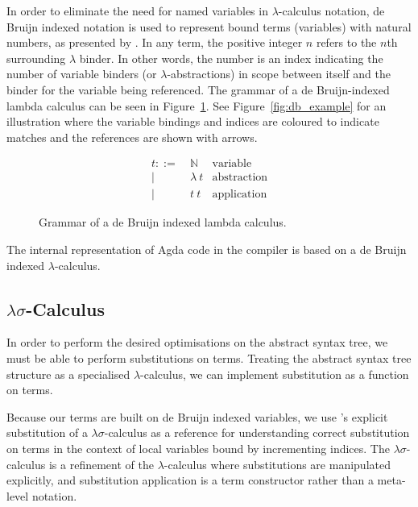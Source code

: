In order to eliminate the need for named variables in $\lambda$-calculus notation, de Bruijn indexed notation is used to represent bound terms (variables) with natural numbers, as presented by \citet{deBruijn-1972}. In any term, the positive integer $n$ refers to the $n$th surrounding $\lambda$ binder. In other words, the number is an index indicating the number of variable binders (or $\lambda$-abstractions) in scope between itself and the binder for the variable being referenced. The grammar of a de Bruijn-indexed lambda calculus can be seen in Figure~\ref{fig:db_lambda_calc}. See Figure~\ref{fig:db_example} for an illustration where the variable bindings and indices are coloured to indicate matches and the references are shown with arrows.



\begin{figure}[h]
\begin{align*}
t ::=~& \mathbb{N}      & \text{variable}\\
    |~& \lambda~t       & \text{abstraction}\\
    |~& t~t             & \text{application}
\end{align*}
\caption{Grammar of a de Bruijn indexed lambda calculus.}
\label{fig:db_lambda_calc}
\end{figure}

The internal representation of Agda code in the compiler is based on a de Bruijn indexed $\lambda$-calculus.

\subsection{$\lambda\sigma$-Calculus}

In order to perform the desired optimisations on the abstract syntax tree, we must be able to perform substitutions on terms. Treating the abstract syntax tree structure as a specialised $\lambda$-calculus, we can implement substitution as a function on terms.

Because our terms are built on de Bruijn indexed variables, we use \citet{Abadi-Cardelli-Curien-Levy-1990}'s explicit substitution of a $\lambda\sigma$-calculus as a reference for understanding correct substitution on terms in the context of local variables bound by incrementing indices. The $\lambda\sigma$-calculus is a refinement of the $\lambda$-calculus where substitutions are manipulated explicitly, and substitution application is a term constructor rather than a meta-level notation.

